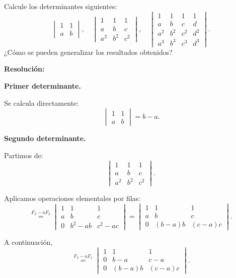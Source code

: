 \documentclass[a4paper,12pt]{article}
\begin{document}
\begin{ejercicio}[title=Ejercicio 34]
Calcule los determinantes siguientes:
\[
\begin{vmatrix}
1 & 1\\
a & b
\end{vmatrix},
\quad
\begin{vmatrix}
1 & 1 & 1\\
a & b & c\\
a^2 & b^2 & c^2
\end{vmatrix},
\quad
\begin{vmatrix}
1 & 1 & 1 & 1\\
a & b & c & d\\
a^2 & b^2 & c^2 & d^2\\
a^3 & b^3 & c^3 & d^3
\end{vmatrix}.
\]
¿Cómo se pueden generalizar los resultados obtenidos?

\tcblower
\textbf{Resolución:}

\textbf{Primer determinante.}

Se calcula directamente:
\[
\boxed{\,\begin{vmatrix}
1 & 1\\
a & b
\end{vmatrix} = b-a.}
\]

\bigskip

\textbf{Segundo determinante.}

Partimos de:
\[
\begin{vmatrix}
1 & 1 & 1\\
a & b & c\\
a^2 & b^2 & c^2
\end{vmatrix}.
\]

Aplicamos operaciones elementales por filas:
\[
\overset{F_3-aF_2}{=}
\begin{vmatrix}
1 & 1 & 1\\
a & b & c\\
0 & b^2-ab & c^2-ac
\end{vmatrix}
=
\begin{vmatrix}
1 & 1 & 1\\
a & b & c\\
0 & (b-a)b & (c-a)c
\end{vmatrix}.
\]

A continuación,
\[
\overset{F_2-aF_1}{=}
\begin{vmatrix}
1 & 1 & 1\\
0 & b-a & c-a\\
0 & (b-a)b & (c-a)c
\end{vmatrix}.
\]


\end{ejercicio}
\end{document}
